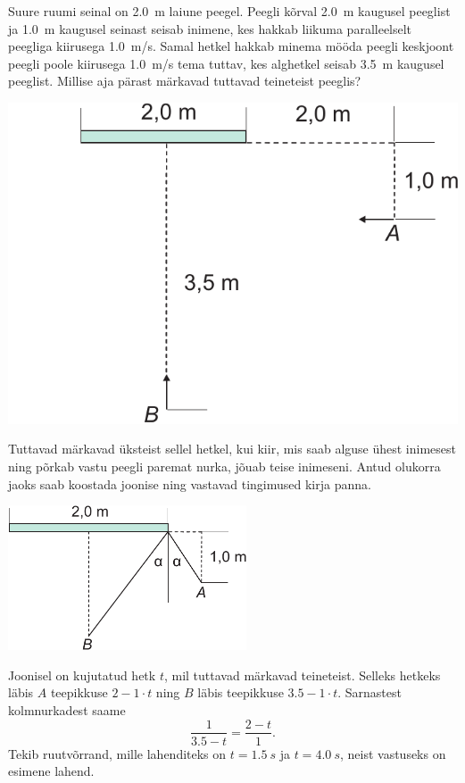 
Suure ruumi seinal on \SI{2,0}{m} laiune peegel. Peegli kõrval \SI{2,0}{m}
kaugusel peeglist ja \SI{1,0}{m} kaugusel seinast seisab inimene, kes hakkab
liikuma paralleelselt peegliga kiirusega \SI{1,0}{m/s}. Samal hetkel hakkab
minema mööda peegli keskjoont peegli poole kiirusega \SI{1,0}{m/s} tema tuttav,
kes alghetkel seisab \SI{3,5}{m} kaugusel peeglist. Millise aja pärast
märkavad tuttavad teineteist peeglis?

\begin{center}
\includegraphics[width=0.5\linewidth]{2012-v2g-01-peegel2}%
\end{center}

\hint
Tuttavad märkavad üksteist sellel hetkel, kui kiir, mis saab alguse ühest inimesest ning põrkab vastu peegli paremat nurka, jõuab teise inimeseni. Antud olukorra jaoks saab koostada joonise ning vastavad tingimused kirja panna.

\solu
\begin{center}
\includegraphics[width=200pt]{2012-v2g-01-peegel_lah}
\end{center}

Joonisel on kujutatud hetk $t$, mil tuttavad märkavad teineteist. Selleks hetkeks läbis $A$ teepikkuse $2-1\cdot t$ ning $B$ läbis teepikkuse $\num{3,5}-1\cdot t$. Sarnastest kolmnurkadest saame
\[
\frac{1}{\num{3,5}-t}=\frac{2-t}{1}.
\]
Tekib ruutvõrrand, mille lahenditeks on $t=\SI{1,5}{s}$ ja $t=\SI{4,0}{s}$, neist vastuseks on esimene lahend.

